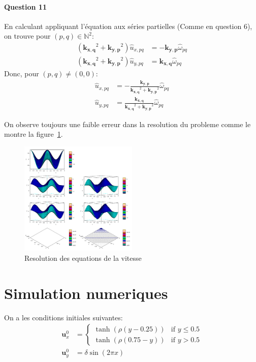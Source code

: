 \documentclass{article}
\newcommand{\complex}[1]{\bm{#1}}
\newcommand{\kxq}{\complex{k_{x,q}}}
\newcommand{\kyp}{\complex{k_{y,p}}}
\begin{document}
\paragraph{Question 11}
En calculant appliquant l'équation aux séries partielles (Comme en question 6), on trouve pour \((p,q)\in\mathbb N^2\):
\begin{align*}
	(\kxq^2 + \kyp^2)\hat{u}_{x,pq} & = -\kyp\hat{\omega}_{pq}\\
	(\kxq^2 + \kyp^2)\hat{u}_{y,pq} & =  \kxq\hat{\omega}_{pq}
\end{align*}
Donc, pour \((p,q) \neq (0,0)\):
\begin{align*}
	\hat{u}_{x,pq} & = -\frac{\kyp}{\kxq^2 + \kyp^2}\hat{\omega}_{pq}\\
	\hat{u}_{y,pq} & =  \frac{\kxq}{\kxq^2 + \kyp^2}\hat{\omega}_{pq}
\end{align*}

On observe toujours une faible erreur dans la resolution du probleme comme le montre la figure~\ref{fig:err_curl}.
\begin{figure}
	\centering
	\includegraphics[width=0.5\textwidth]{poisson_curl_error.png}
	\caption{Resolution des equations de la vitesse}\label{fig:err_curl}
\end{figure}

\section{Simulation numeriques}

On a les conditions initiales suivantes:
\begin{align*}
	\mathbf{u}_x^0 &= \begin{cases}
		\tanh\left(\rho(y-0.25)\right) & \text{if }y\leq 0.5 \\
		\tanh\left(\rho(0.75-y)\right) & \text{if }y > 0.5
	\end{cases} \\
	\mathbf{u}_y^0 &= \delta\sin(2\pi x)
\end{align*}
\end{document}
